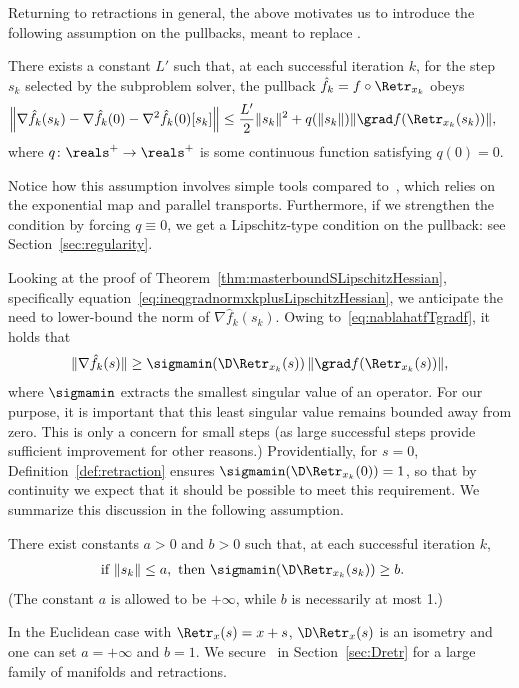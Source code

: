 Returning to retractions in general, the above motivates us to introduce the following assumption on the pullbacks, meant to replace .
\begin{assumption} \label{assu:firstorderregularityvectorretraction}
	There exists a constant $L'$ such that, at each successful iteration $k$, for the step $s_k$ selected by the subproblem solver, the pullback $\hat f_k = f \circ \Retr_{x_k}$ obeys
	\begin{align}
		\left\| \nabla \hat f_k(s_k) - \nabla \hat f_k(0) - \nabla^2 \hat f_k(0)[s_k] \right\| & \leq \frac{L'}{2} \|s_k\|^2 + q(\|s_k\|) \|\grad f(\Retr_{x_k}(s_k))\|,
	\end{align}
	where $q \colon \reals^+ \to \reals^+$ is some continuous function satisfying $q(0) = 0$.
\end{assumption}
Notice how this assumption involves simple tools compared to~, which relies on the exponential map and parallel transports. Furthermore, if we strengthen the condition by forcing $q \equiv 0$, we get a Lipschitz-type condition on the pullback: see Section~\ref{sec:regularity}.

Looking at the proof of Theorem~\ref{thm:masterboundSLipschitzHessian}, specifically equation~\eqref{eq:ineqgradnormxkplusLipschitzHessian}, we anticipate the need to lower-bound the norm of $\nabla \hat f_k(s_k)$. Owing to~\eqref{eq:nablahatfTgradf}, it holds that
\begin{align}
	\|\nabla \hat f_k(s)\| \geq \sigmamin\!\left(\D\Retr_{x_k}(s)\right) \|\grad f(\Retr_{x_k}(s))\|,
	\label{eq:nablahatfgradf}
\end{align}
where $\sigmamin$ extracts the smallest singular value of an operator.
For our purpose, it is important that this least singular value remains %
bounded away from zero. This is only a concern for small steps (as large successful steps provide sufficient improvement for other reasons.) Providentially, for $s = 0$, Definition~\ref{def:retraction} ensures $\sigmamin(\D\Retr_{x_k}(0)) = 1$, so that by continuity we expect that it should be possible to meet this requirement. We summarize this discussion in the following assumption.
\begin{assumption} \label{assu:DRetr}
	There exist constants $a > 0$ and $b > 0$ such that, at each successful iteration $k$,
	\begin{align}
		\textrm{if } \|s_k\| \leq a, \textrm{ then } \sigmamin(\D\Retr_{x_k}(s_k)) & \geq b.
	\end{align}
	(The constant $a$ is allowed to be $+\infty$, while $b$ is necessarily at most 1.)
\end{assumption}
In the Euclidean case with $\Retr_x(s) = x+s$, $\D\Retr_x(s)$ is an isometry and one can set $a = +\infty$ and $b = 1$. We secure~ in Section~\ref{sec:Dretr} for a large family of manifolds and retractions.


